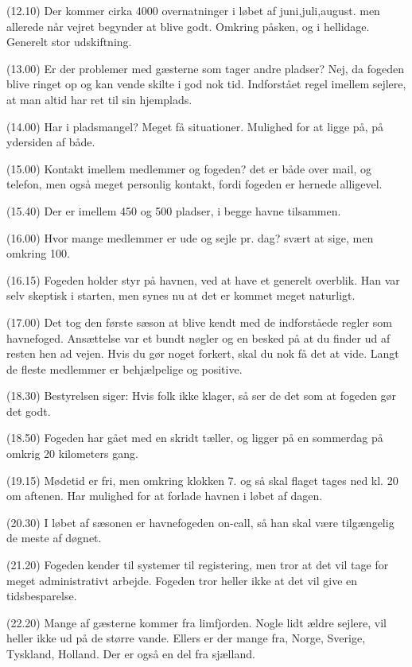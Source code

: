 (12.10) Der kommer cirka 4000 overnatninger i løbet af juni,juli,august. men allerede når vejret begynder at blive godt. Omkring påsken, og i hellidage. Generelt stor udskiftning.

(13.00) Er der problemer med gæsterne som tager andre pladser? Nej, da fogeden blive ringet op og kan vende skilte i god nok tid. Indforstået regel imellem sejlere, at man altid har ret til sin hjemplads.

(14.00) Har i pladsmangel? Meget få situationer. Mulighed for at ligge på, på ydersiden af både.

(15.00) Kontakt imellem medlemmer og fogeden? det er både over mail, og telefon, men også meget personlig kontakt, fordi fogeden er hernede alligevel.

(15.40) Der er imellem 450 og 500 pladser, i begge havne tilsammen.

(16.00) Hvor mange medlemmer er ude og sejle pr. dag? svært at sige, men omkring 100.

(16.15) Fogeden holder styr på havnen, ved at have et generelt overblik. Han var selv skeptisk i starten, men synes nu at det er kommet meget naturligt.

(17.00) Det tog den første sæson at blive kendt med de indforståede regler som havnefoged. Ansættelse var et bundt nøgler og en besked på at du finder ud af resten hen ad vejen. Hvis du gør noget forkert, skal du nok få det at vide. Langt de fleste medlemmer er behjælpelige og positive.

(18.30) Bestyrelsen siger: Hvis folk ikke klager, så ser de det som at fogeden gør det godt.

(18.50) Fogeden har gået med en skridt tæller, og ligger på en sommerdag på omkrig 20 kilometers gang.

(19.15) Mødetid er fri, men omkring klokken 7. og så skal flaget tages ned kl. 20 om aftenen. Har mulighed for at forlade havnen i løbet af dagen.

(20.30) I løbet af sæsonen er havnefogeden on-call, så han skal være tilgængelig de meste af døgnet.

(21.20) Fogeden kender til systemer til registering, men tror at det vil tage for meget administrativt arbejde. Fogeden tror heller ikke at det vil give en tidsbesparelse.

(22.20) Mange af gæsterne kommer fra limfjorden. Nogle lidt ældre sejlere, vil heller ikke ud på de større vande. Ellers er der mange fra, Norge, Sverige, Tyskland, Holland. Der er også en del fra sjælland. 



